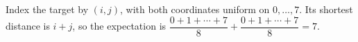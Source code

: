 Index the target by $(i,j)$, with both coordinates uniform on $0,\ldots,7$. Its shortest distance is $i+j$, so the expectation is $\dfrac{0+1+\cdots+7}{8}+\dfrac{0+1+\cdots+7}{8}=\boxed7$.
